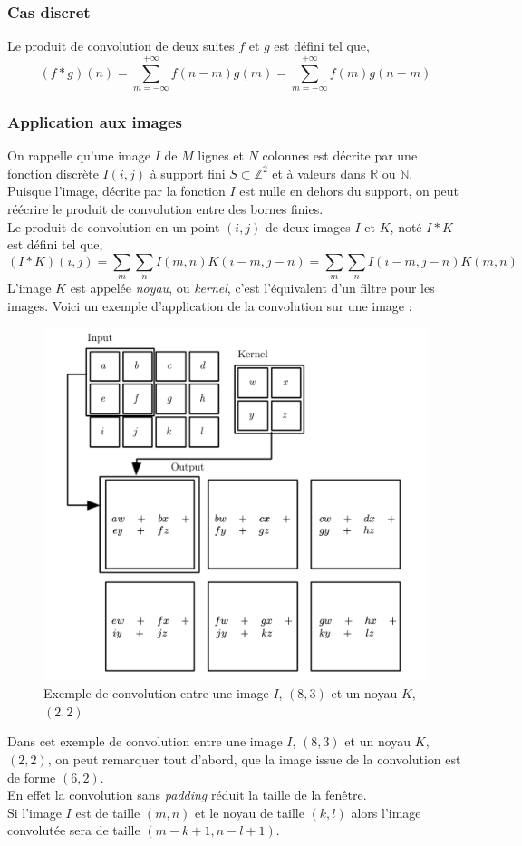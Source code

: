 \documentclass[10pt,a4paper]{report}
\begin{document}
			\subsubsection{Cas discret}
			Le produit de convolution de deux suites $f$ et $g$ est défini tel que,
			$$(f *g)(n) = \sum_{m = -\infty}^{+\infty}{f(n-m)g(m)} = \sum_{m = -\infty}^{+\infty}{f(m)g(n-m)}$$
			\subsubsection{Application aux images}
			On rappelle qu'une image $I$ de $M$ lignes et $N$ colonnes est décrite par une fonction discrète $I(i,j)$ à support fini $S \subset \mathbb{Z}^2$ et à valeurs dans $\mathbb{R}$ ou $\mathbb{N}$.\\
			Puisque l'image, décrite par la fonction $I$ est nulle en dehors du support, on peut réécrire le produit de convolution entre des bornes finies.\\
			Le produit de convolution en un point $(i,j)$ de deux images $I$ et $K$, noté $I * K$ est défini tel que,
			$$(I*K)(i,j) = \sum_{m}\sum_{n}{I(m,n)K(i-m,j-n)} = \sum_{m}\sum_{n}{I(i-m,j-n)K(m,n)}$$
			L'image $K$ est appelée \emph{noyau}, ou \emph{kernel}, c'est l'équivalent d'un filtre pour les images.
			Voici un exemple d'application de la convolution sur une image :
			\begin{figure}[H]
				\begin{center}
					\includegraphics[scale=0.25]{Images/convolution.png}
					\caption{Exemple de convolution entre une image $I$, $(8,3)$ et un noyau $K$, $(2,2)$}
				\end{center}
			\end{figure}
			Dans cet exemple de convolution entre une image $I$, $(8,3)$ et un noyau $K$, $(2,2)$, on peut remarquer tout d'abord, que la image issue de la convolution est de forme $(6,2)$.\\
			En effet la convolution sans \emph{padding} réduit la taille de la fenêtre.\\
			Si l'image $I$ est de taille $(m,n)$ et le noyau de taille $(k,l)$ alors l'image convolutée sera de taille $(m-k+1,n-l+1)$.
\end{document}
